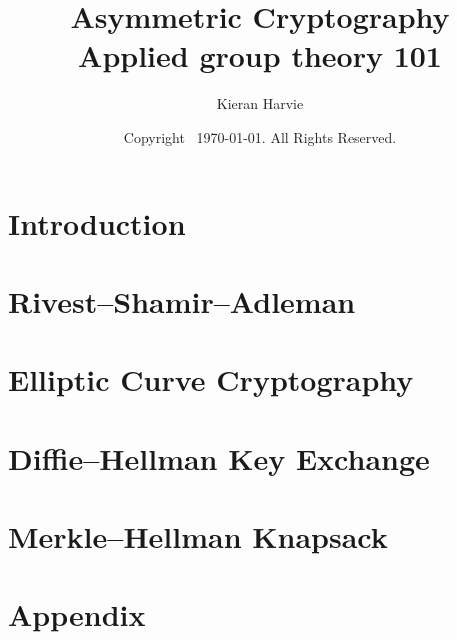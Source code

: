 \documentclass[12pt]{report}
\title{Asymmetric Cryptography \\ \large Applied group theory 101}
\date{Copyright \textcopyright \, \today. All Rights Reserved.}
\author{Kieran Harvie}
\begin{document}
\maketitle
\tableofcontents

\chapter{Introduction}




\chapter{Rivest–Shamir–Adleman}



\chapter{Elliptic Curve Cryptography}




\chapter{Diffie–Hellman Key Exchange}


\chapter{Merkle–Hellman Knapsack}



\renewcommand{\thechapter}{A}
\chapter{Appendix}



\end{document}
